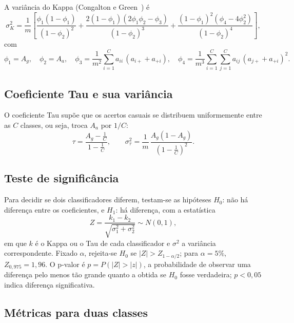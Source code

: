 \documentclass[12pt,a4paper]{article}
\begin{document}
A variância do Kappa (Congalton e Green~\cite{congalton}) é
\begin{equation}
  \sigma_K^2 = \frac{1}{m}\left[
    \frac{\phi_1(1-\phi_1)}{(1-\phi_2)^2}
  + \frac{2(1-\phi_1)(2\phi_1\phi_2-\phi_3)}{(1-\phi_2)^3}
  + \frac{(1-\phi_1)^2(\phi_4-4\phi_2^2)}{(1-\phi_2)^4}
  \right],
  \label{eq:var_kappa}
\end{equation}
com
\begin{equation}
  \phi_1 = A_g,\quad \phi_2 = A_a,\quad
  \phi_3 = \frac{1}{m^2}\sum_{i=1}^{C} a_{ii}\,(a_{i+} + a_{+i}),\quad
  \phi_4 = \frac{1}{m^3}\sum_{i=1}^{C}\sum_{j=1}^{C} a_{ij}\,(a_{j+} + a_{+i})^2.
  \label{eq:phis}
\end{equation}

\subsection{Coeficiente Tau e sua variância}

O coeficiente Tau supõe que os acertos casuais se distribuem uniformemente entre as $C$ classes, ou seja, troca $A_a$ por $1/C$:
\begin{equation}
  \tau = \frac{A_g - \frac{1}{C}}{1 - \frac{1}{C}}, \qquad
  \sigma_\tau^2 = \frac{1}{m}\,\frac{A_g(1-A_g)}{\left(1-\frac{1}{C}\right)^2}.
  \label{eq:tau}
\end{equation}

\subsection{Teste de significância}\label{sec:teste}

Para decidir se dois classificadores diferem, testam-se as hipóteses $H_0$: não há diferença entre os coeficientes, e $H_1$: há diferença, com a estatística
\begin{equation}
  Z = \frac{k_1 - k_2}{\sqrt{\sigma_1^2 + \sigma_2^2}} \sim N(0, 1),
  \label{eq:z}
\end{equation}
em que $k$ é o Kappa ou o Tau de cada classificador e $\sigma^2$ a variância correspondente. Fixado $\alpha$, rejeita-se $H_0$ se $|Z| > Z_{1-\alpha/2}$; para $\alpha = 5\%$, $Z_{0{,}975} = 1{,}96$. O p-valor é $p = P(|Z| > |z|)$, a probabilidade de observar uma diferença pelo menos tão grande quanto a obtida se $H_0$ fosse verdadeira; $p < 0{,}05$ indica diferença significativa.

\subsection{Métricas para duas classes}\label{sec:binarias}
\end{document}
